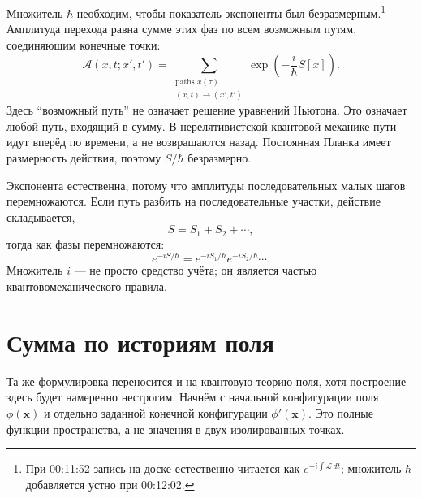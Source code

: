 Множитель \(\hbar\) необходим, чтобы показатель экспоненты был безразмерным.\footnote{При 00:11:52 запись на доске естественно читается как \(e^{-i\int\mathcal{L}\,dt}\); множитель \(\hbar\) добавляется устно при 00:12:02.} Амплитуда перехода равна сумме этих фаз по всем возможным путям, соединяющим конечные точки:
\begin{equation}
\mathcal{A}(x,t;x',t')
=
\sum_{\substack{\text{paths }x(\tau)\\(x,t)\rightarrow(x',t')}}
\exp\!\left(-\frac{i}{\hbar}S[x]\right).
\end{equation}
Здесь ``возможный путь'' не означает решение уравнений Ньютона. Это означает любой путь, входящий в сумму. В нерелятивистской квантовой механике пути идут вперёд по времени, а не возвращаются назад. Постоянная Планка имеет размерность действия, поэтому \(S/\hbar\) безразмерно.

Экспонента естественна, потому что амплитуды последовательных малых шагов перемножаются. Если путь разбить на последовательные участки, действие складывается,
\begin{equation}
S=S_1+S_2+\cdots,
\end{equation}
тогда как фазы перемножаются:
\begin{equation}
e^{-iS/\hbar}
=e^{-iS_1/\hbar}e^{-iS_2/\hbar}\cdots.
\end{equation}
Множитель \(i\) — не просто средство учёта; он является частью квантовомеханического правила.

\begin{classroomqa}
\end{classroomqa}

\begin{classroomqa}
\end{classroomqa}

\section{Сумма по историям поля}

Та же формулировка переносится и на квантовую теорию поля, хотя построение здесь будет намеренно нестрогим. Начнём с начальной конфигурации поля \(\phi(\mathbf{x})\) и отдельно заданной конечной конфигурации \(\phi'(\mathbf{x})\). Это полные функции пространства, а не значения в двух изолированных точках.

